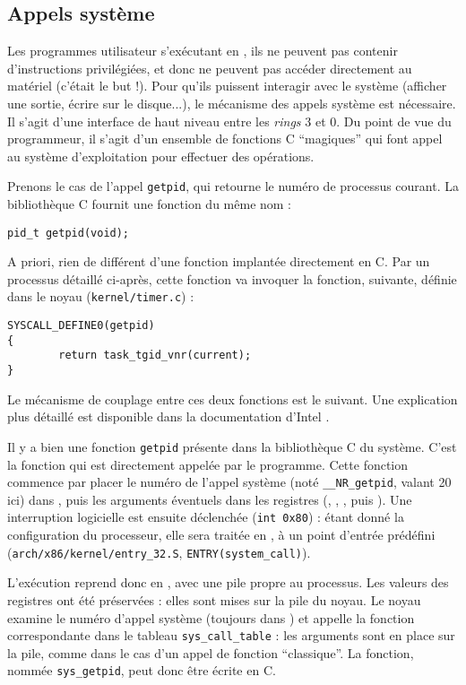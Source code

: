 \subsection{Appels système}

Les programmes utilisateur s'exécutant en , ils ne peuvent pas
contenir d'instructions privilégiées, et donc ne peuvent pas accéder directement
au matériel (c'était le but !). Pour qu'ils puissent interagir avec le système
(afficher une sortie, écrire sur le disque...), le mécanisme des appels système
est nécessaire. Il s'agit d'une interface de haut niveau entre les \emph{rings}
3 et 0. Du point de vue du programmeur, il s'agit d'un ensemble de fonctions C
``magiques'' qui font appel au système d'exploitation pour effectuer des
opérations.

Prenons le cas de l'appel \texttt{getpid}, qui retourne le numéro de processus
courant. La bibliothèque C fournit une fonction du même nom :

\begin{Verbatim}
pid_t getpid(void);
\end{Verbatim}

A priori, rien de différent d'une fonction implantée directement en C. Par un
processus détaillé ci-après, cette fonction va invoquer la fonction, suivante,
définie dans le noyau (\texttt{kernel/timer.c}) :

\begin{Verbatim}
SYSCALL_DEFINE0(getpid)
{
        return task_tgid_vnr(current);
}
\end{Verbatim}



Le mécanisme de couplage entre ces deux fonctions est le suivant. Une
explication plus détaillé est disponible dans la documentation d'Intel
\cite{intelsys}.

Il y a bien une fonction \texttt{getpid} présente dans la bibliothèque C du
système. C'est la fonction qui est directement appelée par le programme. Cette
fonction commence par placer le numéro de l'appel système (noté
\texttt{\_\_NR\_getpid}, valant 20 ici) dans \eax, puis les arguments éventuels
dans les registres (\ebx, \ecx, \edx, \esi puis \edi). Une interruption
logicielle est ensuite déclenchée (\texttt{int 0x80}) : étant donné la
configuration du processeur, elle sera traitée en , à un point
d'entrée prédéfini (\texttt{arch/x86/kernel/entry\_32.S},
\texttt{ENTRY(system\_call)}).

L'exécution reprend donc en , avec une pile propre au processus.
Les valeurs des registres ont été préservées : elles sont mises sur la pile du
noyau. Le noyau examine le numéro d'appel système (toujours dans \eax) et
appelle la fonction correspondante dans le tableau \texttt{sys\_call\_table} :
les arguments sont en place sur la pile, comme dans le cas d'un appel de
fonction ``classique''. La fonction, nommée \texttt{sys\_getpid}, peut donc être
écrite en C.


